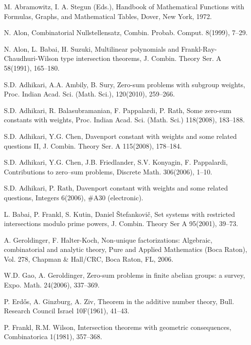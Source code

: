 \documentclass[11pt,reqno]{amsart}
\numberwithin{equation}{section}
\theoremstyle{definition}
\numberwithin{equation}{section}
\begin{document}
\begin{thebibliography}{20}

 M. Abramowitz, I. A. Stegun (Eds.),  Handbook of
Mathematical Functions with Formulas, Graphs, and Mathematical
Tables, Dover, New York, 1972.

 N. Alon, Combinatorial Nullstellensatz,
Combin. Probab. Comput. 8(1999), 7--29.

 N. Alon, L. Babai, H. Suzuki,
Multilinear polynomials and Frankl-Ray-Chaudhuri-Wilson type
intersection theorems, J. Combin. Theory Ser. A 58(1991), 165--180.

 S.D. Adhikari, A.A. Ambily, B. Sury, Zero-sum
problems with subgroup weights,  Proc. Indian Acad. Sci. (Math.
Sci.), 120(2010),  259--266.

 S.D. Adhikari, R. Balasubramanian, F. Pappalardi,
P. Rath, Some zero-sum constants with weights,  Proc. Indian Acad.
Sci. (Math. Sci.) 118(2008), 183--188.

S.D. Adhikari, Y.G. Chen, Davenport constant with weights and some
related questions II, J. Combin. Theory Ser. A 115(2008), 178--184.

S.D. Adhikari, Y.G. Chen, J.B. Friedlander, S.V. Konyagin, F.
Pappalardi, Contributions to zero--sum problems, Discrete Math.
306(2006), 1--10.

S.D. Adhikari, P. Rath, Davenport constant with weights and some
related questions, Integers 6(2006), \#A30 (electronic).

L. Babai, P. Frankl, S. Kutin, Daniel \v{S}tefankovi\v{c},
Set systems with restricted intersections modulo prime powers, J.
Combin. Theory Ser A 95(2001), 39--73.

 A. Geroldinger, F. Halter-Koch, Non-unique factorizations:
Algebraic, combinatorial and analytic theory, Pure and Applied
Mathematics (Boca Raton), Vol. 278, Chapman \& Hall/CRC, Boca Raton,
FL, 2006.

W.D. Gao, A. Geroldinger, Zero-sum problems in finite abelian
groups: a survey, Expo. Math. 24(2006), 337--369.

P. Erd\H{o}s, A. Ginzburg, A. Ziv, Theorem in the additive number
theory, Bull. Research Council Israel 10F(1961), 41--43.

 P. Frankl, R.M. Wilson,
Intersection theorems with geometric consequences, Combinatorica
1(1981), 357--368.


\end{thebibliography}
\end{document}

